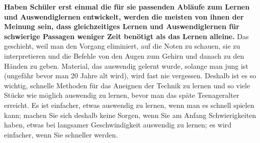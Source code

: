 \textbf{Haben Schüler erst einmal die für sie passenden Abläufe zum Lernen und Auswendiglernen entwickelt, werden die meisten von ihnen der Meinung sein, dass gleichzeitiges Lernen und Auswendiglernen für schwierige Passagen weniger Zeit benötigt als das Lernen alleine.}
Das geschieht, weil man den Vorgang eliminiert, auf die Noten zu schauen, sie zu interpretieren und die Befehle von den Augen zum Gehirn und danach zu den Händen zu geben.
Material, das auswendig gelernt wurde, solange man jung ist (ungefähr bevor man 20 Jahre alt wird), wird fast nie vergessen.
Deshalb ist es so wichtig, schnelle Methoden für das Aneignen der Technik zu lernen und so viele Stücke wie möglich auswendig zu lernen, bevor man das späte Teenageralter erreicht.
Es ist einfacher, etwas auswendig zu lernen, wenn man es schnell spielen kann; machen Sie sich deshalb keine Sorgen, wenn Sie am Anfang Schwierigkeiten haben, etwas bei langsamer Geschwindigkeit auswendig zu lernen; es wird einfacher, wenn Sie schneller werden.


\hypertarget{c1ii12mental}{}

